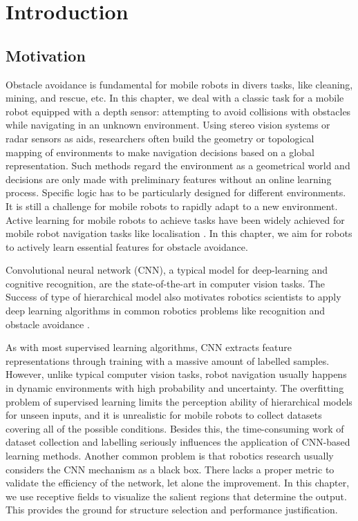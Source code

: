 
\section{Introduction}

\subsection{Motivation}
\label{sec:ob_motivation}
Obstacle avoidance is fundamental for mobile robots in divers tasks, like cleaning, mining, and rescue, etc.
In this chapter, we deal with a classic task for a mobile robot equipped with a depth sensor: attempting to avoid collisions with obstacles while navigating in an unknown environment.
Using stereo vision systems or radar sensors as aids, researchers often build the geometry or topological mapping of environments \cite{liu2015incremental, liu2012markov} to make navigation decisions based on a global representation. Such methods regard the environment as a geometrical world and decisions are only made with preliminary features without an online learning process. Specific logic has to be particularly designed for different environments. It is still a challenge for mobile robots to rapidly adapt to a new environment. Active learning for mobile robots to achieve tasks have been widely achieved for mobile robot navigation tasks like localisation \cite{burgard1997active, singh2018active}. In this chapter, we aim for robots to actively learn essential features for obstacle avoidance.

Convolutional neural network (CNN), a typical model for deep-learning and cognitive recognition, are the state-of-the-art in computer vision tasks. The Success of type of hierarchical model also motivates robotics scientists to apply deep learning algorithms in common robotics problems like recognition and obstacle avoidance \cite{giusti2016machine, muller2005off, tai2016deep}.

As with most supervised learning algorithms, CNN extracts feature representations through training with a massive amount of labelled samples.
However, unlike typical computer vision tasks, robot navigation usually happens in dynamic environments with high probability and uncertainty. The overfitting problem of supervised learning limits the perception ability of hierarchical models for unseen inputs, and it is unrealistic for mobile robots to collect datasets covering all of the possible conditions. Besides this, the time-consuming work of dataset collection and labelling seriously influences the application of CNN-based learning methods. Another common problem is that robotics research usually considers the CNN mechanism as a black box. There lacks a proper metric to validate the efficiency of the network, let alone the improvement. In this chapter, we use receptive fields to visualize the salient regions that determine the output. This provides the ground for structure selection and performance justification.

